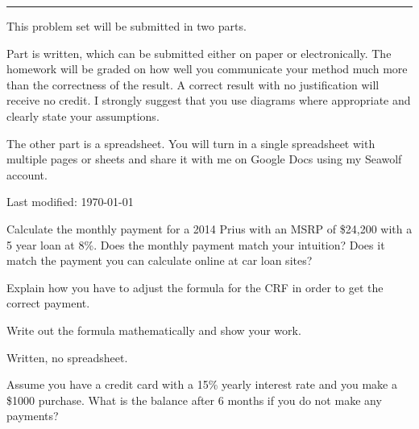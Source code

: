 \documentclass{article}
\begin{document}
\hrule
\vspace{10pt}

This problem set will be submitted in two parts.

Part is written, which can be submitted either on paper or
electronically.  The homework will be graded on how well you communicate
your method much more than the correctness of the result.  A correct
result with no justification will receive no credit.  I strongly
suggest that you use diagrams where appropriate and clearly state your
assumptions.

The other part is a spreadsheet.  You will turn in a single spreadsheet
with multiple pages or sheets and share it with me on Google Docs using
my Seawolf account.

{\tiny Last modified: \today}


Calculate the monthly payment for a 2014 Prius with an MSRP of \$24,200
with a 5 year loan at 8\%.  Does the monthly payment match your
intuition?  Does it match the payment you can calculate online at car
loan sites?

Explain how you have to adjust the formula for the CRF in order to get
the correct payment.

Write out the formula mathematically and show your work.

Written, no spreadsheet.



Assume you have a credit card with a 15\% yearly interest rate and you
make a \$1000 purchase.  What is the balance after 6 months if you do
not make any payments?
\end{document}
